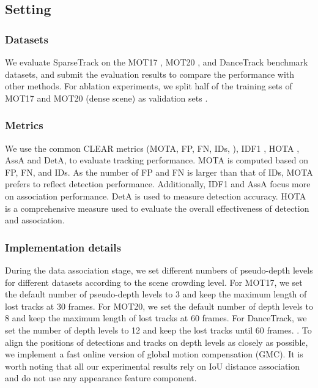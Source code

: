 \subsection{Setting}
\subsubsection{Datasets}We evaluate SparseTrack on the MOT17 \cite{mot16}, MOT20 \cite{mot20}, and DanceTrack \cite{dancetrack} benchmark datasets, and submit the evaluation results to compare the performance with other methods. For ablation experiments, we split half of the training sets of MOT17 and MOT20 (dense scene) as validation sets .
\subsubsection{Metrics}We use the common CLEAR metrics \cite{CLEAR-metrics} (MOTA, FP, FN, IDs, \etc), IDF1 \cite{idf1}, HOTA \cite{hota}, AssA and DetA, to evaluate tracking performance. MOTA is computed based on FP, FN, and IDs. As the number of FP and FN is larger than that of IDs, MOTA prefers to reflect detection performance. Additionally, IDF1 and AssA focus more on association performance. DetA is used to measure detection accuracy. HOTA is a comprehensive measure used to evaluate the overall effectiveness of detection and association.
\subsubsection{Implementation details}During the data association stage, we set different numbers of pseudo-depth levels for different datasets according to the scene crowding level. For MOT17, we set the default number of pseudo-depth levels to 3 and keep the maximum length of lost tracks at 30 frames. For MOT20, we set the default number of depth levels to 8 and keep the maximum length of lost tracks at 60 frames. For DanceTrack, we set the number of depth levels to 12 and keep the lost tracks until 60 frames. . To align the positions of detections and tracks on depth levels as closely as possible, we implement a fast online version of global motion compensation (GMC). It is worth noting that all our experimental results rely on IoU distance association and do not use any appearance feature component.

